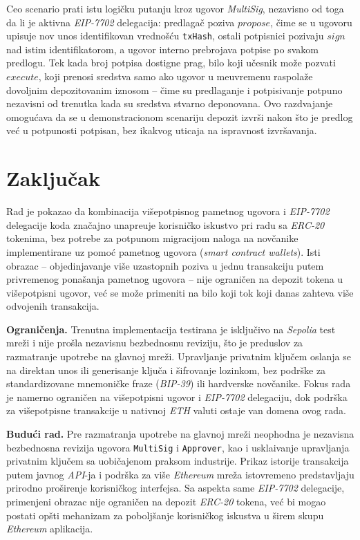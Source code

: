 \documentclass[10pt,a4paper]{article}
\newcommand{\en}[1]{\textit{\textenglish{#1}}}
\begin{document}
Ceo scenario prati istu logi\v cku putanju kroz ugovor \en{MultiSig}, nezavisno od toga da li je aktivna \en{EIP-7702} delegacija: predlaga\v c poziva $propose$, \v cime se u ugovoru upisuje nov unos identifikovan vredno\v s\'cu \texttt{txHash}, ostali potpisnici pozivaju $sign$ nad istim identifikatorom, a ugovor interno prebrojava potpise po svakom predlogu. Tek kada broj potpisa dostigne prag, bilo koji u\v cesnik mo\v ze pozvati $execute$, koji prenosi sredstva samo ako ugovor u me\dj uvremenu raspola\v ze dovoljnim depozitovanim iznosom -- \v cime su predlaganje i potpisivanje potpuno nezavisni od trenutka kada su sredstva stvarno deponovana. Ovo razdvajanje omogu\'cava da se u demonstracionom scenariju depozit izvr\v si nakon \v sto je predlog ve\'c u potpunosti potpisan, bez ikakvog uticaja na ispravnost izvr\v savanja.

\section{Zaklju\v cak}

Rad je pokazao da kombinacija vi\v sepotpisnog pametnog ugovora i \en{EIP-7702} delegacije koda zna\v cajno unapre\dj uje korisni\v cko iskustvo pri radu sa \en{ERC-20} tokenima, bez potrebe za potpunom migracijom naloga na nov\v canike implementirane uz pomo\'c pametnog ugovora (\en{smart contract wallets}). Isti obrazac -- objedinjavanje vi\v se uzastopnih poziva u jednu transakciju putem privremenog pona\v sanja pametnog ugovora -- nije ograni\v cen na depozit tokena u vi\v sepotpisni ugovor, ve\'c se mo\v ze primeniti na bilo koji tok koji danas zahteva vi\v se odvojenih transakcija.

\textbf{Ograni\v cenja.} Trenutna implementacija testirana je isklju\v civo na \en{Sepolia} test mre\v zi i nije pro\v sla nezavisnu bezbednosnu reviziju, \v sto je preduslov za razmatranje upotrebe na glavnoj mre\v zi. Upravljanje privatnim klju\v cem oslanja se na direktan unos ili generisanje klju\v ca i \v sifrovanje lozinkom, bez podr\v ske za standardizovane mnemoni\v cke fraze (\en{BIP-39}) ili hardverske nov\v canike. Fokus rada je namerno ograni\v cen na vi\v sepotpisni ugovor i \en{EIP-7702} delegaciju, dok podr\v ska za vi\v sepotpisne transakcije u nativnoj \en{ETH} valuti ostaje van domena ovog rada.

\textbf{Budu\'ci rad.} Pre razmatranja upotrebe na glavnoj mre\v zi neophodna je nezavisna bezbednosna revizija ugovora \texttt{MultiSig} i \texttt{Approver}, kao i uskla\dj ivanje upravljanja privatnim klju\v cem sa uobi\v cajenom praksom industrije. Prikaz istorije transakcija putem javnog \en{API}-ja i podr\v ska za vi\v se \en{Ethereum} mre\v za istovremeno predstavljaju prirodno pro\v sirenje korisni\v ckog interfejsa. Sa aspekta same \en{EIP-7702} delegacije, primenjeni obrazac nije ograni\v cen na depozit \en{ERC-20} tokena, ve\'c bi mogao postati op\v sti mehanizam za pobolj\v sanje korisni\v ckog iskustva u \v sirem skupu \en{Ethereum} aplikacija.
\end{document}
